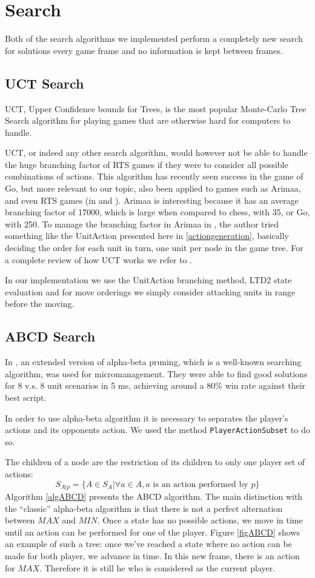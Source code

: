 \section{Search}
Both of the search algorithms we implemented perform a completely new search for solutions every game frame and no information is kept between frames.

\subsection{UCT Search}
UCT, Upper Confidence bounds for Trees, is the most popular Monte-Carlo Tree Search algorithm for playing games that are otherwise hard for computers to handle. \cite{mcts}

UCT, or indeed any other search algorithm, would however not be able to handle the huge branching factor of RTS games if they were to consider all possible combinations of actions.
This algorithm has recently seen success in the game of Go, but more relevant to our topic, also been applied to games such as Arimaa, and even RTS games (in \cite{portfolio} and \cite{wargusuct}).
Arimaa is interesting because it has an average branching factor of 17000, which is large when compared to chess, with 35, or Go, with 250.
To manage the branching factor in Arimaa in \cite{arimaa}, the author tried something like the UnitAction presented here in \ref{actiongeneration}, basically deciding the order for each unit in turn, one unit per node in the game tree.
For a complete review of how UCT works we refer to \cite{mcts}.

In our implementation we use the UnitAction branching method, LTD2 state evaluation and for move orderings we simply consider attacking units in range before the moving.

\subsection{ABCD Search}
In \cite{abcd}, an extended version of alpha-beta pruning, which is a well-known searching algorithm, was used for micromanagement. 
They were able to find good solutions for 8 v.s. 8 unit scenarios in 5 ms, achieving around a 80\% win rate against their best script.

In order to use alpha-beta algorithm it is necessary to separates the player's actions and its opponents action. We used the method \texttt{PlayerActionSubset} to do so. 

The children of a node are the restriction of its children to only one player set of actions:
$$
S_{A|p} = \{A \in S_A | \forall a \in A, a \text{ is an action performed by $p$}\}
$$
Algorithm \ref{algABCD} presents the ABCD algorithm.
The main distinction with the ``classic'' alpha-beta algorithm is that there is not a perfect alternation between $MAX$ and $MIN$. Once a state has no possible actions, we move in time until an action can be performed for one of the player. 
Figure \ref{figABCD} shows an example of such a tree: once we've reached a state where no action can be made for both player, we advance in time. In this new frame, there is an action for $MAX$. Therefore it is still he who is considered as the current player.

